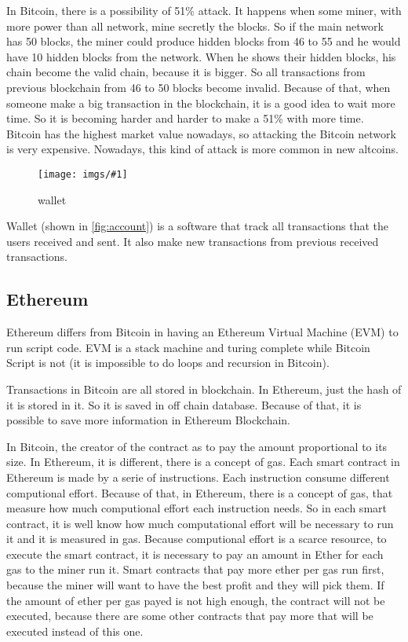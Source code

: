 \documentclass[12pt]{article}
\newcommand{\incgraph}[2]{\texttt{[image: imgs/\#1]}}
\newcommand{\incimgdiv}[3]{
  \begin{figure}
    \incgraph{#1.#2}{#3}
    \caption{#1}
    \label{fig:#1}
  \end{figure}
}
\begin{document}
In Bitcoin, there is a possibility of 51\% attack.
It happens when some miner, with more power than all network, mine secretly the blocks.
So if the main network has 50 blocks, the miner could produce hidden blocks from 46 to 55
and he would have 10 hidden blocks from the network.
When he shows their hidden blocks, his chain become the valid chain, because it is bigger.
So all transactions from previous blockchain from 46 to 50 blocks become invalid.
Because of that, when someone make a big transaction in the blockchain, it is a good idea
to wait more time.
So it is becoming harder and harder to make a 51\% with more time.
Bitcoin has the highest market value nowadays, so attacking the Bitcoin network is very expensive.
Nowadays, this kind of attack is more common in new altcoins.

\incimgdiv{wallet}{png}{2}

Wallet (shown in \ref{fig:account}) is a software that track all transactions 
that the users received and sent.
It also make new transactions from previous received transactions.

\subsection{Ethereum}

Ethereum differs from Bitcoin in having an Ethereum Virtual Machine (EVM) to run script code.
EVM is a stack machine and turing complete while Bitcoin Script is not
(it is impossible to do loops and recursion in Bitcoin).

Transactions in Bitcoin are all stored in blockchain.
In Ethereum, just the hash of it is stored in it.
So it is saved in off chain database.
Because of that, it is possible to save more information in Ethereum Blockchain.

In Bitcoin, the creator of the contract as to pay the amount proportional to its size.
In Ethereum, it is different, there is a concept of gas.
Each smart contract in Ethereum is made by a serie of instructions.
Each instruction consume different computional effort.
Because of that, in Ethereum, there is a concept of gas, that measure how much computional effort
each instruction needs.
So in each smart contract, it is well know how much computational effort will be necessary to run it
and it is measured in gas.
Because computional effort is a scarce resource, to execute the smart contract, it is necessary to
pay an amount in Ether for each gas to the miner run it.
Smart contracts that pay more ether per gas run first, because the miner will want to have the best
profit and they will pick them.
If the amount of ether per gas payed is not high enough, the contract will not be executed,
because there are some other contracts that pay more that will be executed instead of this one.
\end{document}
